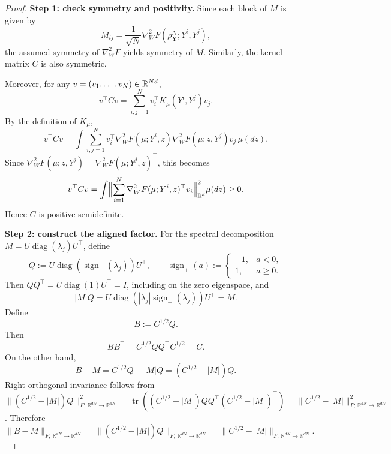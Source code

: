 \begin{proof}
\noindent\textbf{Step 1: check symmetry and positivity.}
Since each block of $M$ is given by
\[
M_{ij}=\frac1{\sqrt N}\nabla_W^2F(\rho_{\mathbf Y}^N;Y^i,Y^j),
\]
the assumed symmetry of $\nabla_W^2F$ yields symmetry of $M$.
Similarly, the kernel matrix $C$ is also symmetric.

Moreover, for any $v=(v_1,\dots,v_N)\in \mathbb{R}^{Nd}$,
\[
v^\top C v
=
\sum_{i,j=1}^N
v_i^\top K_\mu(Y^i,Y^j)v_j.
\]
By the definition of $K_\mu$,
\[
v^\top C v
=
\int
\sum_{i,j=1}^N
v_i^\top
\nabla_W^2F(\mu;Y^i,z)\nabla_W^2F(\mu;z,Y^j)
v_j\,
\mu(dz).
\]
Since $\nabla_W^2F(\mu;z,Y^j)=\nabla_W^2F(\mu;Y^j,z)^\top$, this becomes
\[
v^\top C v
=
\int
\Bigl\|
\sum_{i=1}^N
\nabla_W^2F(\mu;Y^i,z)^\top v_i
\Bigr\|_{\mathbb R^d}^2
\mu(dz)
\ge 0.
\]
Hence $C$ is positive semidefinite.


\par\noindent\textbf{Step 2: construct the aligned factor.}
For the spectral decomposition
$M=U\operatorname{diag}(\lambda_j)U^\top$, define
\[
 Q:=U\operatorname{diag}(\operatorname{sign}_+(\lambda_j))U^\top,
 \qquad
 \operatorname{sign}_+(a):=
 \begin{cases}-1,&a<0,\\1,&a\ge0.\end{cases}
\]
Then $QQ^\top=U\operatorname{diag}(1)U^\top=I$, including on the
zero eigenspace, and
\[
 |M|Q=U\operatorname{diag}(|\lambda_j|\operatorname{sign}_+(\lambda_j))U^\top=M.
\]
Define
\[
B:=C^{1/2}Q.
\]
Then
\[
BB^\top
=
C^{1/2}QQ^\top C^{1/2}
=
C.
\]
On the other hand,
\[
B-M
=
C^{1/2}Q-|M|Q
=
(C^{1/2}-|M|)Q.
\]
Right orthogonal invariance follows from
$\|(C^{1/2}-|M|)Q\|_{F;\,\mathbb R^{dN}\to\mathbb R^{dN}}^2
=\operatorname{tr}((C^{1/2}-|M|)QQ^\top(C^{1/2}-|M|)^\top)
=\|C^{1/2}-|M|\|_{F;\,\mathbb R^{dN}\to\mathbb R^{dN}}^2$. Therefore
\[
\|B-M\|_{F;\,\mathbb R^{dN}\to\mathbb R^{dN}}
=
\|(C^{1/2}-|M|)Q\|_{F;\,\mathbb R^{dN}\to\mathbb R^{dN}}
=
\|C^{1/2}-|M|\|_{F;\,\mathbb R^{dN}\to\mathbb R^{dN}}.
\]


\end{proof}
